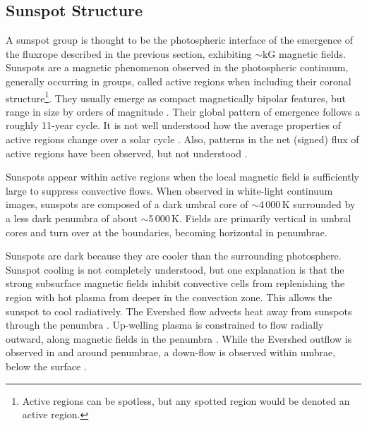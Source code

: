 \subsection{Sunspot Structure}\label{sect:sunspots}

A sunspot group is thought to be the photospheric interface of the emergence of the \gls{fluxrope} described in the previous section, exhibiting $\sim$kG magnetic fields. 
Sunspots are a magnetic phenomenon observed in the photospheric continuum, generally occurring in groups, called active regions when including their coronal structure\footnote{Active regions can be spotless, but any spotted region would be denoted an active region.}. They usually emerge as compact magnetically bipolar features, but range in size by orders of magnitude \citep{parnell:2009}. Their global pattern of emergence follows a roughly 11-year cycle. It is not well understood how the average properties of active regions change over a solar cycle \citep{harvey:1993}. Also, patterns in the net (signed) flux of active regions have been observed, but not understood \citep{zharkov:2006}. %

Sunspots appear within active regions when the local magnetic field is sufficiently large to suppress convective flows. When observed in white-light continuum images, sunspots are composed of a dark umbral core of $\sim$4\,000\,K surrounded by a less dark penumbra of about $\sim$5\,000\,K. Fields are primarily vertical in umbral cores and turn over at the boundaries, becoming horizontal in penumbrae. 

Sunspots are dark because they are cooler than the surrounding photosphere. Sunspot cooling is not completely understood, but one explanation is that the strong subsurface magnetic fields inhibit convective cells from replenishing the region with hot plasma from deeper in the convection zone. This allows the sunspot to cool radiatively. The Evershed flow \citep{Evershed:1909} advects heat away from sunspots through the penumbra \citep{Schlichenmaier:2003}. Up-welling plasma is constrained to flow radially outward, along  magnetic fields in the penumbra \citep{Solanki:1994}. While the Evershed outflow is observed in and around penumbrae, a down-flow is observed within umbrae, below the surface \citep{Duvall:1996}.

